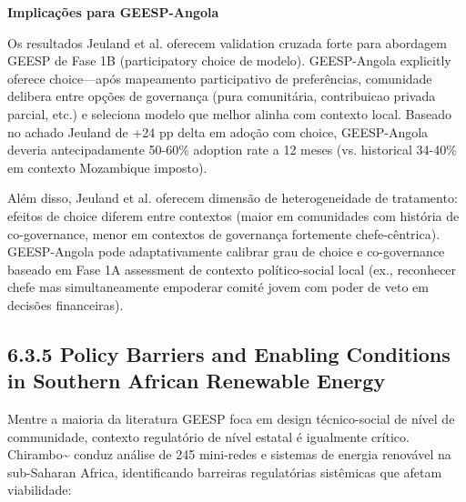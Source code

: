 \documentclass[12pt, a4paper]{article}
\begin{document}
\textbf{Implicações para GEESP-Angola}

Os resultados Jeuland et al. oferecem validation cruzada forte para abordagem GEESP de Fase 1B (participatory choice de modelo). GEESP-Angola explicitly oferece choice—após mapeamento participativo de preferências, comunidade delibera entre opções de governança (pura comunitária, contribuicao privada parcial, etc.) e seleciona modelo que melhor alinha com contexto local. Baseado no achado Jeuland de +24 pp delta em adoção com choice, GEESP-Angola deveria antecipadamente 50-60\% adoption rate a 12 meses (vs. historical 34-40\% em contexto Mozambique imposto).

Além disso, Jeuland et al. oferecem dimensão de heterogeneidade de tratamento: efeitos de choice diferem entre contextos (maior em comunidades com história de co-governance, menor em contextos de governança fortemente chefe-cêntrica). GEESP-Angola pode adaptativamente calibrar grau de choice e co-governance baseado em Fase 1A assessment de contexto político-social local (ex., reconhecer chefe mas simultaneamente empoderar comité jovem com poder de veto em decisões financeiras).

\subsection*{6.3.5 Policy Barriers and Enabling Conditions in Southern African Renewable Energy}

Mentre a maioria da literatura GEESP foca em design técnico-social de nível de communidade, contexto regulatório de nível estatal é igualmente crítico. Chirambo\textasciitilde{}\citep{Chirambo2018} conduz análise de 245 mini-redes e sistemas de energia renovável na sub-Saharan Africa, identificando barreiras regulatórias sistêmicas que afetam viabilidade:
\end{document}
